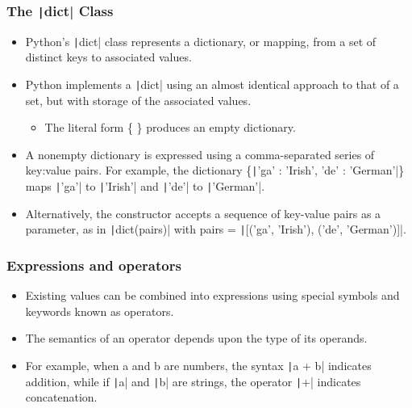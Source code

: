 \begin{frame}
    \frametitle{The \texttt|dict| Class}

    \begin{itemize}
        \item  Python's \texttt|dict| class represents a dictionary, or mapping, from a set of distinct keys to associated values.
        \item Python implements a \texttt|dict| using an almost identical approach to that of a set, but with storage of the associated values.
              \begin{itemize}
                  \item The literal form \{ \} produces an empty dictionary.
              \end{itemize}
        \item A nonempty dictionary is expressed using a comma-separated series of key:value pairs. For example, the dictionary \{\texttt|'ga' : 'Irish', 'de' : 'German'|\} maps \texttt|'ga'| to \texttt|'Irish'| and \texttt|'de'| to \texttt|'German'|.
        \item Alternatively, the constructor accepts a sequence of key-value pairs as a parameter, as in \texttt|dict(pairs)| with pairs = \texttt|[('ga', 'Irish'), ('de', 'German')]|.
    \end{itemize}

\end{frame}

\begin{frame}
    \frametitle{Expressions and operators}

    \begin{itemize}
        \item Existing values can be combined into expressions using special symbols and keywords known as operators.
        \item The semantics of an operator depends upon the type of its operands.
        \item For example, when a and b are numbers, the syntax \texttt|a + b| indicates addition, while if \texttt|a| and \texttt|b| are strings, the operator \texttt|+| indicates concatenation.

    \end{itemize}

\end{frame}

